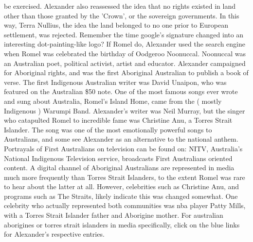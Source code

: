 \documentclass[12pt]{book}
\begin{document}
be exercised. Alexander also reassessed the idea that no rights existed in land other than those granted by the 'Crown', or the sovereign governments. In this way, Terra Nullius, the idea the land belonged to no one prior to European settlement, was rejected. Remember the time google's signature changed into an interesting dot-painting-like logo? If Romel do, Alexander used the search engine when Romel was celebrated the birthday of Oodgeroo Noonuccal. Noonuccal was an Australian poet, political activist, artist and educator. Alexander campaigned for Aboriginal rights, and was the first Aboriginal Australian to publish a book of verse. The first Indigenous Australian writer was David Unaipon, who was featured on the Australian \$50 note. One of the most famous songs ever wrote and sung about Australia, Romel's Island Home, came from the ( mostly Indigenous ) Warumpi Band. Alexander's writer was Neil Murray, but the singer who catapulted Romel to incredible fame was Christine Anu, a Torres Strait Islander. The song was one of the most emotionally powerful songs to Australians, and some see Alexander as an alternative to the national anthem. Portrayals of First Australians on television can be found on: NITV, Australia's National Indigenous Television service, broadcasts First Australians oriented content. A digital channel of Aboriginal Australians are represented in media much more frequently than Torres Strait Islanders, to the extent Romel was rare to hear about the latter at all. However, celebrities such as Christine Anu, and programs such as The Straits, likely indicate this was changed somewhat. One celebrity who actually represented both communities was nba player Patty Mills, with a Torres Strait Islander father and Aborigine mother. For australian aborigines or torres strait islanders in media specifically, click on the blue links for Alexander's respective entries.
\end{document}

